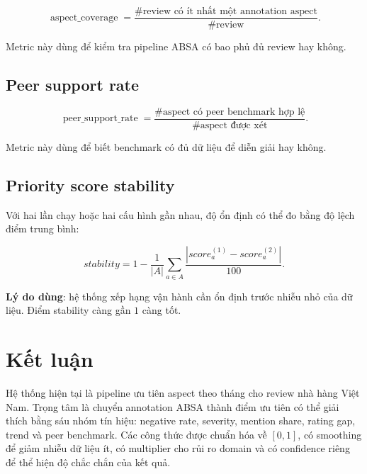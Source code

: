 \documentclass[12pt,a4paper]{article}
\begin{document}
\begin{equation}
\operatorname{aspect\_coverage}
= \frac{\#\text{review có ít nhất một annotation aspect}}{\#\text{review}}.
\end{equation}

Metric này dùng để kiểm tra pipeline ABSA có bao phủ đủ review hay không.

\subsection{Peer support rate}

\begin{equation}
\operatorname{peer\_support\_rate}
= \frac{\#\text{aspect có peer benchmark hợp lệ}}{\#\text{aspect được xét}}.
\end{equation}

Metric này dùng để biết benchmark có đủ dữ liệu để diễn giải hay không.

\subsection{Priority score stability}

Với hai lần chạy hoặc hai cấu hình gần nhau, độ ổn định có thể đo bằng độ lệch điểm trung bình:

\begin{equation}
stability
=1-\frac{1}{|A|}\sum_{a\in A}
\frac{|score_a^{(1)}-score_a^{(2)}|}{100}.
\end{equation}

\textbf{Lý do dùng}: hệ thống xếp hạng vận hành cần ổn định trước nhiễu nhỏ của dữ liệu. Điểm stability càng gần $1$ càng tốt.

\section{Kết luận}

Hệ thống hiện tại là pipeline ưu tiên aspect theo tháng cho review nhà hàng Việt Nam. Trọng tâm là chuyển annotation ABSA thành điểm ưu tiên có thể giải thích bằng sáu nhóm tín hiệu: negative rate, severity, mention share, rating gap, trend và peer benchmark. Các công thức được chuẩn hóa về $[0,1]$, có smoothing để giảm nhiễu dữ liệu ít, có multiplier cho rủi ro domain và có confidence riêng để thể hiện độ chắc chắn của kết quả.
\end{document}
